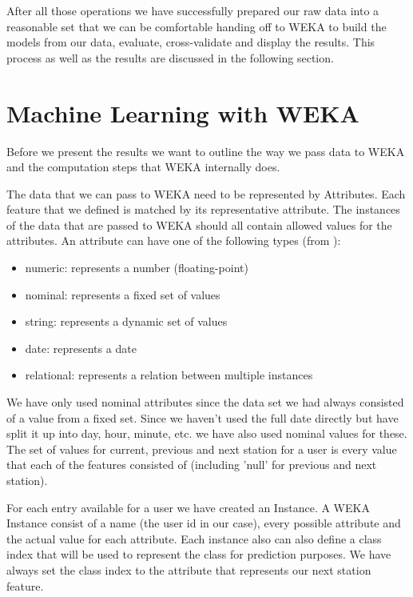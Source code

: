 After all those operations we have successfully prepared our raw data into a reasonable set that we can be comfortable handing off to WEKA to build the models from our data, evaluate, cross-validate and display the results. This process as well as the results are discussed in the following section.

\section{Machine Learning with WEKA}
Before we present the results we want to outline the way we pass data to WEKA and the computation steps that WEKA internally does.

The data that we can pass to WEKA need to be represented by Attributes. Each feature that we defined is matched by its representative attribute. The instances of the data that are passed to WEKA should all contain allowed values for the attributes. An attribute can have one of the following types (from \cite{WEKAJavaDocAttribute}):
\begin{itemize}
	\item numeric: represents a number (floating-point)
	\item nominal: represents a fixed set of values
	\item string: represents a dynamic set of values
	\item date: represents a date
	\item relational: represents a relation between multiple instances
\end{itemize}


We have only used nominal attributes since the data set we had always consisted of a value from a fixed set. Since we haven't used the full date directly but have split it up into day, hour, minute, etc. we have also used nominal values for these. The set of values for current, previous and next station for a user is every value that each of the features consisted of (including 'null' for previous and next station).

For each entry available for a user we have created an Instance. A WEKA Instance consist of a name (the user id in our case), every possible attribute and the actual value for each attribute. Each instance also can also define a class index that will be used to represent the class for prediction purposes. We have always set the class index to the attribute that represents our next station feature.

